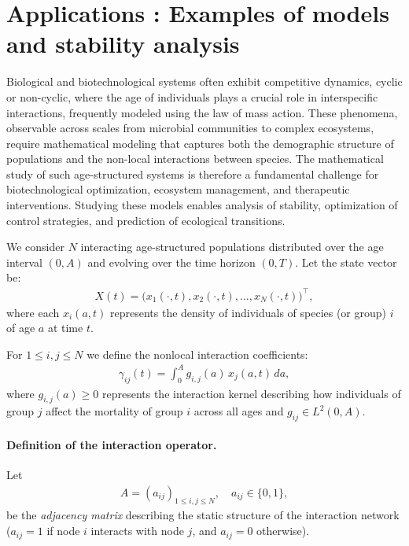 \documentclass[10pt, a4paper]{amsart}
\theoremstyle{plain}
\theoremstyle{definition}
\theoremstyle{remark}
\numberwithin{equation}{section}
\begin{document}
\section{\bf Applications : Examples of models and stability analysis}\label{s3}%
Biological and biotechnological systems often exhibit competitive dynamics, cyclic or non-cyclic, where the age of individuals plays a crucial role in interspecific interactions, frequently modeled using the law of mass action. These phenomena, observable across scales from microbial communities to complex ecosystems, require mathematical modeling that captures both the demographic structure of populations and the non-local interactions between species. The mathematical study of such age-structured systems is therefore a fundamental challenge for biotechnological optimization, ecosystem management, and therapeutic interventions. Studying these models enables analysis of stability, optimization of control strategies, and prediction of ecological transitions.

We consider $N$ interacting age-structured populations distributed over the age interval $(0,A)$ and evolving over the time horizon $(0,T)$.  Let the state vector be:
\begin{align}
X(t) = \big( x_1(\cdot,t), x_2(\cdot,t), \dots, x_N(\cdot,t) \big)^\top,
\end{align}
where each $x_i(a,t)$ represents the density of individuals of species (or group) $i$ of age $a$ at time $t$.  

For $1 \leq i,j \leq N$ we define the nonlocal interaction coefficients:
\begin{align}
\gamma_{ij}(t) = \int_0^A g_{i,j}(a) \, x_j(a,t) \, da,
\end{align}
where $g_{i,j}(a) \geq 0$ represents the interaction kernel describing how individuals of group $j$ affect the mortality of group $i$ across all ages and $g_{ij}\in L^2(0,A)$.\paragraph{Definition of the interaction operator.}
Let 
\begin{align}\label{equation3.3}
A = (a_{ij})_{1 \le i,j \le N}, \quad a_{ij} \in \{0,1\},
\end{align}
be the \emph{adjacency matrix} describing the static structure of the interaction network 
(\(a_{ij} = 1\) if node \(i\) interacts with node \(j\), and \(a_{ij} = 0\) otherwise).
\end{document}
